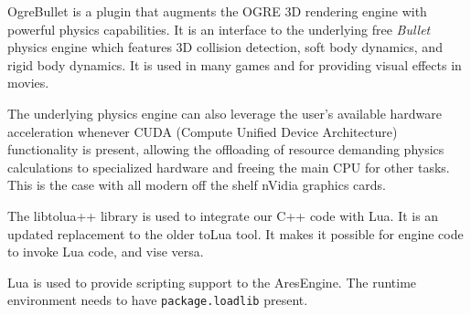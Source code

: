 \startitemize[4]
\setupwhitespace[big]

OgreBullet is a plugin that augments the OGRE 3D rendering engine with powerful physics capabilities. It is an interface to the underlying free {\it Bullet} physics engine which features 3D collision detection, soft body dynamics, and rigid body dynamics. It is used in many games and for providing visual effects in movies. 

The underlying physics engine can also leverage the user's available hardware acceleration whenever CUDA (Compute Unified Device Architecture) functionality is present, allowing the offloading of resource demanding physics calculations to specialized hardware and freeing the main CPU for other tasks. This is the case with all modern off the shelf nVidia graphics cards.
\stopitemize



\startitemize[4]
\setupwhitespace[big]

The libtolua++ library is used to integrate our C++ code with Lua. It is an updated replacement to the older toLua tool. It makes it possible for engine code to invoke Lua code, and vise versa.


Lua is used to provide scripting support to the AresEngine. The runtime environment needs to have {\tt package.loadlib} present.
\stopitemize

\StopChapter

